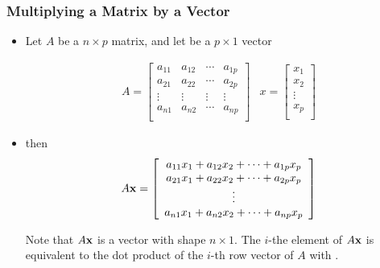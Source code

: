 \documentclass{beamer}
\begin{document}

\begin{frame}
  \frametitle{Multiplying a Matrix by a Vector}

\begin{itemize}
	\item Let $A$ be a $n \times p$ matrix, and let  be a $p \times 1$ vector

\[
\begin{array}{cc}
A = \left[ \begin{array}{cccc}
a_{11} & a_{12} & \cdots & a_{1p} \\
a_{21} & a_{22} & \cdots & a_{2p} \\
\vdots & \vdots & \vdots & \vdots \\
a_{n1} & a_{n2} & \cdots & a_{np} \\

\end{array}
\right]

&	

x = \left[ \begin{array}{c}
x_1 \\ x_2 \\ \vdots \\x_p \\
\end{array}
\right]
\end{array}
\]	

	
\item then
\[
A\mathbf{x} = \left[ \begin{array}{c}
a_{11}x_1 + a_{12}x_2 + \cdots + a_{1p}x_p \\
a_{21}x_1 + a_{22}x_2 + \cdots + a_{2p}x_p \\
\vdots \\
a_{n1}x_1 + a_{n2}x_2 + \cdots + a_{np}x_p \\

\end{array}
\right]
\]

Note that $A\mathbf{x}$ is a vector with shape $n \times 1$. The $i$-the element of $A\mathbf{x}$ is equivalent to the dot product of the $i$-th row vector of $A$ with .

\end{itemize}

\end{frame}

\end{document}
